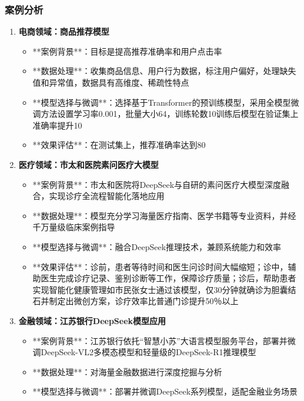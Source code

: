 \begin{frame}[allowframebreaks]
    \frametitle{案例分析}
    \begin{enumerate}
        \item
            \textbf{电商领域：商品推荐模型}
            \begin{itemize}
                \item **案例背景**：目标是提高推荐准确率和用户点击率
                \item **数据处理**：收集商品信息、用户行为数据，标注用户偏好，处理缺失值和异常值，数据具有高维度、稀疏性特点
                \item **模型选择与微调**：选择基于Transformer的预训练模型，采用全模型微调方法设置学习率0.001，批量大小64，训练轮数10训练后模型在验证集上准确率提升10%
                \item **效果评估**：在测试集上，推荐准确率达到80%
            \end{itemize}
        \item
            \textbf{医疗领域：市太和医院素问医疗大模型}
            \begin{itemize}
                \item **案例背景**：市太和医院将DeepSeek与自研的素问医疗大模型深度融合，实现诊疗全流程智能化落地应用
                \item **数据处理**：模型充分学习海量医疗指南、医学书籍等专业资料，并经千万量级临床案例指导
                \item **模型选择与微调**：融合DeepSeek推理技术，兼顾系统能力和效率
                \item **效果评估**：诊前，患者等待时间和医生问诊时间大幅缩短；诊中，辅助医生完成诊疗记录、鉴别诊断等工作，保障诊疗质量；诊后，帮助患者实现智能化健康管理如市民张女士通过该模型，仅30分钟就确诊为胆囊结石并制定出微创方案，诊疗效率比普通门诊提升50％以上
            \end{itemize}
        \item
            \textbf{金融领域：江苏银行DeepSeek模型应用}
            \begin{itemize}
                \item **案例背景**：江苏银行依托“智慧小苏”大语言模型服务平台，部署并微调DeepSeek-VL2多模态模型和轻量级的DeepSeek-R1推理模型
                \item **数据处理**：对海量金融数据进行深度挖掘与分析
                \item **模型选择与微调**：部署并微调DeepSeek系列模型，适配金融业务场景

\end{itemize}
\end{enumerate}
\end{frame}
